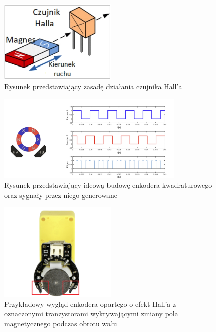 \begin{figure}[h]
    \centering
    \includegraphics[width=0.5\textwidth]{./graf/halla-enc.jpg}
    \caption{Rysunek przedstawiający zasadę działania czujnika Hall'a \cite{bib:hall_net}}
    \label{rys2:encoders-graf}
\end{figure}

\begin{figure}[h]
    \centering
    \includegraphics[width=0.8\textwidth]{./graf/enkoders.png}
    \caption{Rysunek przedstawiający ideową budowę enkodera kwadraturowego oraz sygnały przez niego generowane \cite{bib:encoders-pid}}
    \label{rys2:encoders-graf}
\end{figure}

\begin{figure}[h]
    \centering
    \includegraphics[width=0.5\textwidth]{./graf/enkoder-silnik.png}
    \caption{Przykładowy wygląd enkodera opartego o efekt Hall'a z oznaczonymi tranzystorami wykrywającymi zmiany pola magnetycznego podczas obrotu wału \cite{bib:botland-hall}}
    \label{rys2:encoders-sample}
\end{figure}

